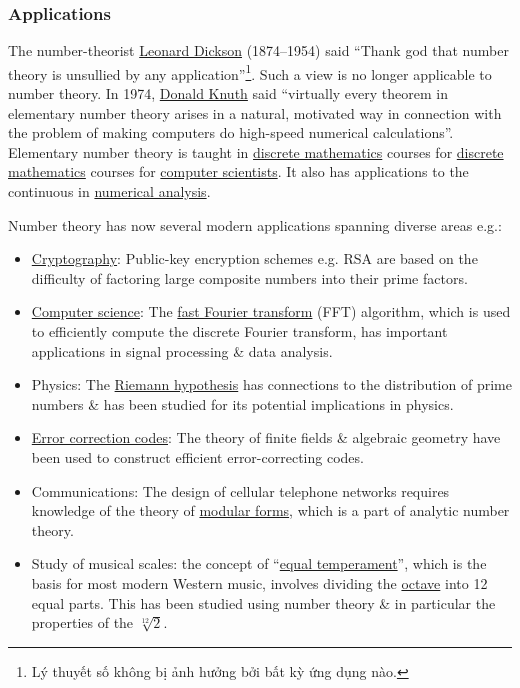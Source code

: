 \documentclass{article}
\begin{document}
\subsubsection{Applications}
The number-theorist \href{https://en.wikipedia.org/wiki/Leonard_Dickson}{Leonard Dickson} (1874--1954) said ``Thank god that number theory is unsullied by any application''\footnote{Lý thuyết số không bị ảnh hưởng bởi bất kỳ ứng dụng nào.}. Such a view is no longer applicable to number theory. In 1974, \href{https://en.wikipedia.org/wiki/Donald_Knuth}{\sc Donald Knuth} said ``virtually every theorem in elementary number theory arises in a natural, motivated way in connection with the problem of making computers do high-speed numerical calculations''. Elementary number theory is taught in \href{https://en.wikipedia.org/wiki/Discrete_mathematics}{discrete mathematics} courses for \href{https://en.wikipedia.org/wiki/Computer_scientist}{discrete mathematics} courses for \href{https://en.wikipedia.org/wiki/Computer_scientist}{computer scientists}. It also has applications to the continuous in \href{https://en.wikipedia.org/wiki/Numerical_analysis}{numerical analysis}.

Number theory has now several modern applications spanning diverse areas e.g.:
\begin{itemize}
	\item \href{https://en.wikipedia.org/wiki/Cryptography}{Cryptography}: Public-key encryption schemes e.g. RSA are based on the difficulty of factoring large composite numbers into their prime factors.
	\item \href{https://en.wikipedia.org/wiki/Computer_science}{Computer science}: The \href{https://en.wikipedia.org/wiki/Fast_Fourier_transform}{fast Fourier transform} (FFT) algorithm, which is used to efficiently compute the discrete Fourier transform, has important applications in signal processing \& data analysis.
	\item Physics: The \href{https://en.wikipedia.org/wiki/Riemann_hypothesis}{Riemann hypothesis} has connections to the distribution of prime numbers \& has been studied for its potential implications in physics.
	\item \href{https://en.wikipedia.org/wiki/Error_correction_code}{Error correction codes}: The theory of finite fields \& algebraic geometry have been used to construct efficient error-correcting codes.
	\item Communications: The design of cellular telephone networks requires knowledge of the theory of \href{https://en.wikipedia.org/wiki/Modular_form}{modular forms}, which is a part of analytic number theory.
	\item Study of musical scales: the concept of ``\href{https://en.wikipedia.org/wiki/Equal_temperament}{equal temperament}'', which is the basis for most modern Western music, involves dividing the \href{https://en.wikipedia.org/wiki/Octave}{octave} into 12 equal parts. This has been studied using number theory \& in particular the properties of the $\sqrt[12]{2}$.
\end{itemize}
\end{document}
